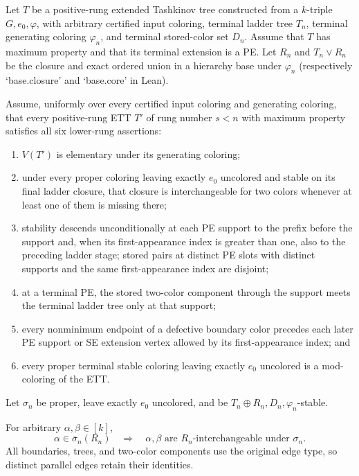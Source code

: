 \begin{lemma}
Let $T$ be a positive-rung extended Tashkinov tree constructed from a
$k$-triple $G,e_0,\varphi$, with arbitrary certified input coloring,
terminal ladder tree $T_n$, terminal generating coloring $\varphi_n$,
and terminal stored-color set $D_n$.  Assume that $T$ has maximum
property and that its terminal extension is a PE.  Let $R_n$ and
$T_n\vee R_n$ be the closure and exact ordered union in a hierarchy
base under $\varphi_n$ (respectively `base.closure' and `base.core'
in Lean).

Assume, uniformly over every certified input coloring and generating
coloring, that every positive-rung ETT $T'$ of rung number $s<n$ with
maximum property satisfies all six lower-rung assertions:
\begin{enumerate}
\item $V(T')$ is elementary under its generating coloring;
\item under every proper coloring leaving exactly $e_0$ uncolored and
stable on its final ladder closure, that closure is interchangeable for
two colors whenever at least one of them is missing there;
\item stability descends unconditionally at each PE support to the prefix before the
support and, when its first-appearance index is greater than one, also to
the preceding ladder stage; stored pairs at
distinct PE slots with distinct supports and the same first-appearance
index are disjoint;
\item at a terminal PE, the stored two-color component through the
support meets the terminal ladder tree only at that support;
\item every nonminimum endpoint of a defective boundary color precedes
each later PE support or SE extension vertex allowed by its
first-appearance index; and
\item every proper terminal stable coloring leaving exactly $e_0$
uncolored is a mod-coloring of the ETT.
\end{enumerate}

Let $\sigma_n$ be proper, leave exactly $e_0$ uncolored, and be
$T_n\oplus R_n,D_n,\varphi_n$-stable.

For arbitrary $\alpha,\beta\in[k]$,
\[
 \alpha\in\overline\sigma_n(R_n)
 \quad\Longrightarrow\quad
 \alpha,\beta\text{ are $R_n$-interchangeable under }\sigma_n.
\]
All boundaries, trees, and two-color components use the original edge
type, so distinct parallel edges retain their identities.
\end{lemma}
